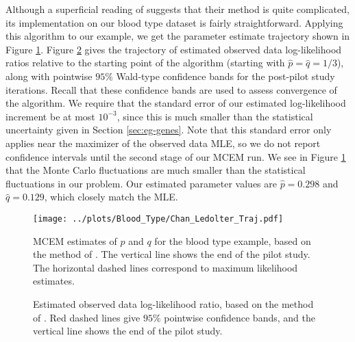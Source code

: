 \documentclass[ss]{imsart}
\theoremstyle{plain}
\theoremstyle{definition}
\theoremstyle{remark}
\begin{document}

Although a superficial reading of \citeauthor{Cha95} suggests that their method is quite complicated, its implementation on our blood type dataset is fairly straightforward. Applying this algorithm to our example, we get the parameter estimate trajectory shown in Figure \ref{fig:blood_CL_MCEM_estimates}. Figure \ref{fig:blood_CL_MCEM_likelihoods} gives the trajectory of estimated observed data log-likelihood ratios relative to the starting point of the algorithm (starting with $\hat{p} = \hat{q} = 1/3$), along with pointwise $95\%$ Wald-type confidence bands for the post-pilot study iterations. Recall that these confidence bands are used to assess convergence of the algorithm. We require that the standard error of our estimated log-likelihood increment be at most $10^{-3}$, since this is much smaller than the statistical uncertainty given in Section \ref{sec:eg-genes}. Note that this standard error only applies near the maximizer of the observed data MLE, so we do not report confidence intervals until the second stage of our MCEM run. We see in Figure \ref{fig:blood_CL_MCEM_estimates} that the Monte Carlo fluctuations are much smaller than the statistical fluctuations in our problem. Our estimated parameter values are $\hat{p} = 0.298$ and $\hat{q} = 0.129$, which closely match the MLE.

\begin{figure}
    \centering
    \caption{MCEM estimates of $p$ and $q$ for the blood type example, based on the method of \citet{Cha95}. The vertical line shows the end of the pilot study. The horizontal dashed lines correspond to maximum likelihood estimates.}
    \texttt{[image: ../plots/Blood\_Type/Chan\_Ledolter\_Traj.pdf]} 
    \label{fig:blood_CL_MCEM_estimates}
\end{figure}

\begin{figure}
    \centering
    \caption{Estimated observed data log-likelihood ratio, based on the method of \citet{Cha95}. Red dashed lines give $95\%$ pointwise confidence bands, and the vertical line shows the end of the pilot study.}

    
    \label{fig:blood_CL_MCEM_likelihoods}
\end{figure}
\end{document}

